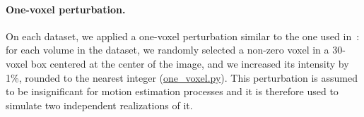 \documentclass[11pt]{IEEEtran}
\begin{document}


\paragraph{One-voxel perturbation.} On each dataset, we applied a one-voxel
perturbation similar to the one used in~\cite{lindsay}: for each volume in
the dataset, we randomly selected a non-zero voxel in a 30-voxel box
centered at the center of the image, and we increased its intensity by 1\%,
rounded to the nearest integer
(\href{https://github.com/big-data-lab-team/one-voxel-motion-correction/blob/master/ovmc/one_voxel.py}{one\_voxel.py}).
This perturbation is assumed to be insignificant for motion estimation
processes and it is therefore used to simulate two independent realizations of
it. 
\end{document}
